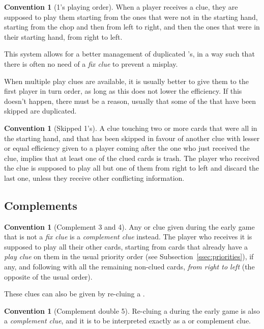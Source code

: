 \documentclass[a4paper]{article}
\theoremstyle{plain}
\theoremstyle{definition}
\newtheorem{convention}[theorem]{Convention}
\begin{document}
\begin{convention}[1's playing order]
	When a player receives a  clue, they are supposed to play them starting from the ones that were not in the starting hand, starting from the chop and then from left to right, and then the ones that were in their starting hand, from right to left.
\end{convention}

This system allows for a better management of duplicated 's, in a way such that there is often no need of a \emph{fix clue} to prevent a misplay.

When multiple play clues are available, it is usually better to give them to the first player in turn order, as long as this does not lower the efficiency. If this doesn't happen, there must be a reason, usually that some of the  that have been skipped are duplicated.

\begin{convention}[Skipped 1's]
	A  clue touching two or more cards that were all in the starting hand, and that has been skipped in favour of another clue with lesser or equal efficiency given to a player coming after the one who just received the clue, implies that at least one of the clued cards is trash. The player who received the clue is supposed to play all but one of them from right to left and discard the last one, unless they receive other conflicting information.
\end{convention}

\subsection{Complements}

\begin{convention}[Complement 3 and 4]
	Any  or  clue given during the early game that is not a \emph{fix clue} is a \emph{complement clue} instead. The player who receives it is supposed to play all their other cards, starting from cards that already have a \emph{play clue} on them in the usual priority order (see Subsection~\ref{ssec:priorities}), if any, and following with all the remaining non-clued cards, \emph{from right to left} (the opposite of the usual order).
\end{convention}

These clues can also be given by re-cluing a .

\begin{convention}[Complement double 5]
	Re-cluing a  during the early game is also a \emph{complement clue}, and it is to be interpreted exactly as a  or  complement clue.
\end{convention}
\end{document}
